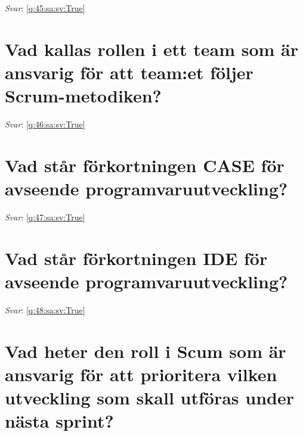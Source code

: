 \documentclass[a4paper,11pt,oneside]{book}
\begin{document}
\begin{sloppypar}
\textit{Svar}: \autoref{q:45:sa:sv:True}



\section{Vad kallas rollen i ett team som \"ar ansvarig f\"or att team:et f\"oljer Scrum-metodiken?}

\label{q:46:sa:sv:False}

\vspace{2cm}

\noindent\makebox[\textwidth]{\hrulefill}

\vspace{1cm}

\textit{Svar}: \autoref{q:46:sa:sv:True}



\section{Vad st\r{a}r f\"orkortningen CASE f\"or avseende programvaruutveckling?}

\label{q:47:sa:sv:False}

\vspace{2cm}

\noindent\makebox[\textwidth]{\hrulefill}

\vspace{1cm}

\textit{Svar}: \autoref{q:47:sa:sv:True}



\section{Vad st\r{a}r f\"orkortningen IDE f\"or avseende programvaruutveckling?}

\label{q:48:sa:sv:False}

\vspace{2cm}

\noindent\makebox[\textwidth]{\hrulefill}

\vspace{1cm}

\textit{Svar}: \autoref{q:48:sa:sv:True}



\section{Vad heter den roll i Scum som \"ar ansvarig f\"or att prioritera vilken utveckling som skall utf\"oras under n\"asta sprint?}


\end{sloppypar}
\end{document}
